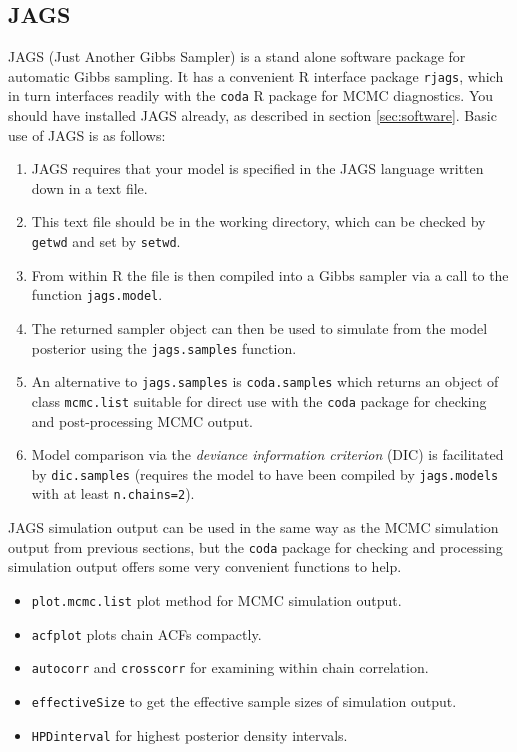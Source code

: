 \documentclass[10pt] {article}
\theoremstyle{definition}
\begin{document}
\subsection{JAGS \label{sec:jags}}

JAGS (Just Another Gibbs Sampler) is a stand alone software package for automatic Gibbs sampling. It has a convenient R interface package {\tt rjags}, which in turn interfaces readily with the {\tt coda} R package for MCMC diagnostics. You should have installed JAGS already, as described in section \ref{sec:software}. Basic use of JAGS is as follows:
\begin{enumerate}
\item JAGS requires that your model is specified in the JAGS language written down in a text file.
\item This text file should be in the working directory, which can be checked by {\tt getwd} and set by {\tt setwd}.
\item From within R the file is then compiled into a Gibbs sampler via a call to the function {\tt jags.model}.
\item The returned sampler object can then be used to simulate from the model posterior using the {\tt jags.samples} function.
\item An alternative to {\tt jags.samples} is {\tt coda.samples} which returns an object of class {\tt mcmc.list} suitable for direct use with the {\tt coda} package for checking and post-processing MCMC output. 
\item Model comparison via the {\em deviance information criterion} (DIC) is facilitated by {\tt dic.samples} (requires the model to have been compiled by {\tt jags.models} with at least {\tt n.chains=2}).
\end{enumerate}
JAGS simulation output can be used in the same way as the MCMC simulation output from previous sections, but the {\tt coda} package for checking and processing simulation output offers some very convenient functions to help.
\begin{itemize}
\item {\tt plot.mcmc.list} plot method for MCMC simulation output.
\item {\tt acfplot} plots chain ACFs compactly.
\item {\tt autocorr} and {\tt crosscorr} for examining within chain correlation.
\item {\tt effectiveSize} to get the effective sample sizes of simulation output.
\item {\tt HPDinterval} for highest posterior density intervals.
\end{itemize}
\end{document}
